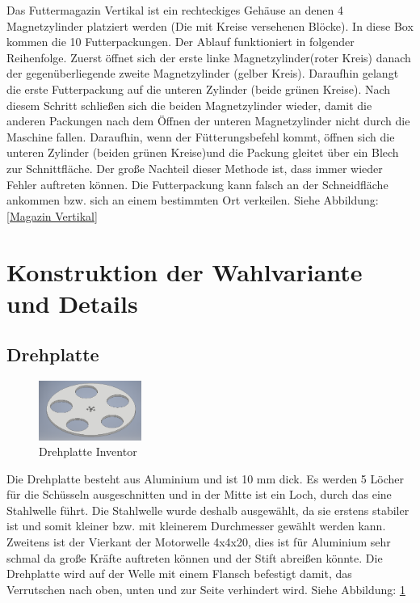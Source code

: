 Das Futtermagazin Vertikal ist ein rechteckiges Gehäuse an denen 4 Magnetzylinder platziert werden (Die mit Kreise versehenen Blöcke). In diese Box kommen die 10 Futterpackungen. Der Ablauf funktioniert in folgender Reihenfolge. Zuerst öffnet sich der erste linke Magnetzylinder(roter Kreis) danach der gegenüberliegende zweite Magnetzylinder (gelber Kreis). Daraufhin gelangt die erste Futterpackung auf die unteren Zylinder (beide grünen Kreise). Nach diesem Schritt schließen sich die beiden Magnetzylinder wieder, damit die anderen Packungen nach dem Öffnen der unteren Magnetzylinder nicht durch die Maschine fallen. Daraufhin, wenn der Fütterungsbefehl kommt, öffnen sich die unteren Zylinder (beiden grünen Kreise)und die Packung gleitet über ein Blech zur Schnittfläche. Der große Nachteil dieser Methode ist, dass immer wieder Fehler auftreten können. Die Futterpackung kann falsch an der Schneidfläche ankommen bzw. sich an einem bestimmten Ort verkeilen. Siehe Abbildung: \ref{Magazin Vertikal}


\section{Konstruktion der Wahlvariante und Details}

\subsection{Drehplatte}

\begin{figure}
\vspace{-20pt}
  \begin{center}
    \includegraphics[width=0.30\textwidth]{Bilder/Inventor/Drehplatte}
  \end{center}
  \caption{Drehplatte Inventor}
  \label{Drehplatte_Inventor}
  \vspace{-10pt}
\end{figure}

Die Drehplatte besteht aus Aluminium und ist 10 mm dick. Es werden 5 Löcher für die Schüsseln ausgeschnitten und in der Mitte ist ein Loch, durch das eine Stahlwelle führt. Die Stahlwelle wurde deshalb ausgewählt, da sie erstens stabiler ist und somit kleiner bzw. mit kleinerem Durchmesser gewählt werden kann. Zweitens ist der Vierkant der Motorwelle 4x4x20, dies ist für Aluminium sehr schmal da große Kräfte auftreten können und der Stift abreißen könnte. Die Drehplatte wird auf der Welle mit einem Flansch befestigt damit, das Verrutschen nach oben, unten und zur Seite verhindert wird. Siehe Abbildung: \ref{Drehplatte_Inventor} \\

